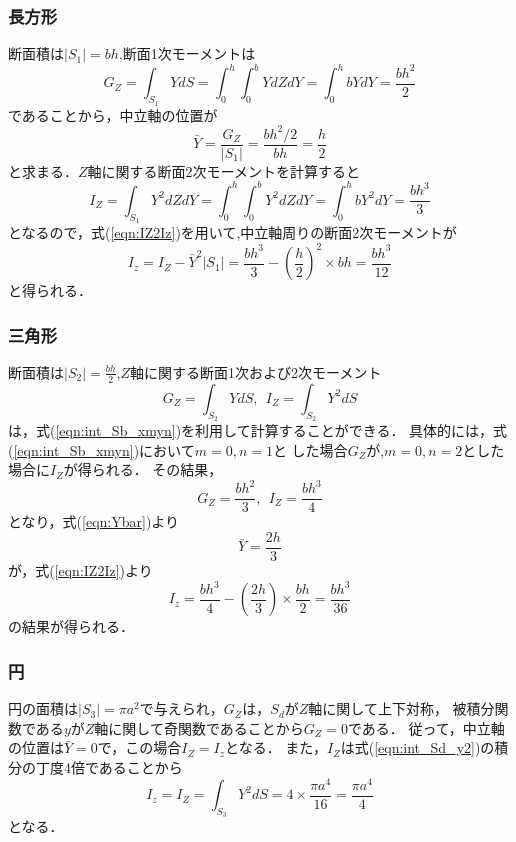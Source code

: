 \documentclass[10pt,a4j]{jarticle}
\begin{document}
\subsubsection{長方形}
断面積は$\left|S_1\right|=bh$,断面1次モーメントは
\begin{equation}
	G_Z=\int_{S_1} Y dS=\int_0^h\int_0^b Y dZdY=\int_0^h bYdY=\frac{bh^2}{2}
	\label{eqn:GZ_S1}
\end{equation}
であることから，中立軸の位置が
\begin{equation}
	\bar Y= \frac{G_Z}{\left| S_1 \right|}=\frac{bh^2/2}{bh}=\frac{h}{2}
\end{equation}
と求まる．$Z$軸に関する断面2次モーメントを計算すると
\begin{equation}
	I_Z=\int_{S_1} Y^2dZdY
	=\int_0^h \int_0^b Y^2dZdY 
	=\int_0^h bY^2dY 
	=\frac{bh^3}{3}
	\label{eqn:IZ_S1}
\end{equation}
となるので，式(\ref{eqn:IZ2Iz})を用いて,中立軸周りの断面2次モーメントが
\begin{equation}
	I_z= I_Z-\bar Y^2 \left| S_1 \right| = \frac{bh^3}{3}-\left(\frac{h}{2}\right)^2\times bh=\frac{bh^3}{12}
	\label{eqn:Iz_S1}
\end{equation}
と得られる．
\subsubsection{三角形}
断面積は$\left|S_2\right|=\frac{bh}{2}$,$Z$軸に関する断面1次および2次モーメント
\begin{equation}
	G_Z=\int_{S_2} Y dS, \ \ I_Z=\int_{S_2}Y^2 dS
\end{equation}
は，式(\ref{eqn:int_Sb_xmyn})を利用して計算することができる．
具体的には，式(\ref{eqn:int_Sb_xmyn})において$m=0, n=1$と
した場合$G_Z$が,$m=0, n=2$とした場合に$I_Z$が得られる．
その結果，
\begin{equation}
	G_Z=\frac{bh^2}{3}, \ \ 
	I_Z=\frac{bh^3}{4}
	\label{eqn:GI_S2}
\end{equation}
となり，式(\ref{eqn:Ybar})より
\begin{equation}
	\bar{Y}=\frac{2h}{3}
\end{equation}
が，式(\ref{eqn:IZ2Iz})より
\begin{equation}
	I_z=\frac{bh^3}{4}-\left(\frac{2h}{3}\right)\times \frac{bh}{2}=\frac{bh^3}{36}
	\label{eqn:Iz_S2}
\end{equation}
の結果が得られる．
\subsubsection{円}
円の面積は$\left|S_3\right|=\pi a^2$で与えられ，$G_Z$は，$S_d$が$Z$軸に関して上下対称，
被積分関数である$y$が$Z$軸に関して奇関数であることから$G_Z=0$である．
従って，中立軸の位置は$\bar Y=0$で，この場合$I_Z=I_z$となる．
また，$I_Z$は式(\ref{eqn:int_Sd_y2})の積分の丁度4倍であることから
\begin{equation}
	I_z=I_Z=\int_{S_3}Y^2dS=4\times \frac{\pi a^4}{16}=\frac{\pi a^4}{4}
	\label{eqn:Iz_S3}
\end{equation}
となる．
\end{document}
